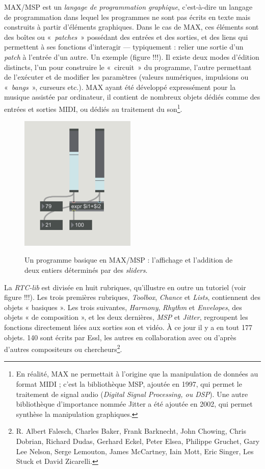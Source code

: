 \documentclass[a4paper,12pt]{article}
\newcommand{\guill}[1]{«~#1~»}
\begin{document}
MAX/MSP est un \emph{langage de programmation graphique}, c'est-à-dire un langage de programmation dans lequel les programmes ne sont pas écrits en texte mais construits à partir d'éléments graphiques. Dans le cas de MAX, ces éléments sont des boîtes ou \guill{\emph{patches}} possédant des entrées et des sorties, et des liens qui permettent à ses fonctions d'interagir --- typiquement : relier une sortie d'un \emph{patch} à l'entrée d'un autre. Un exemple (figure !!!). Il existe deux modes d'édition distincts, l'un pour construire le \guill{circuit} du programme, l'autre permettant de l'exécuter et de modifier les paramètres (valeurs numériques, impulsions ou \guill{\emph{bangs}}, curseurs etc.). MAX ayant été développé expressément pour la musique assistée par ordinateur, il contient de nombreux objets dédiés comme des entrées et sorties MIDI, ou dédiés au traitement du son\footnote{En réalité, MAX ne permettait à l'origine que la manipulation de données au format MIDI ; c'est la bibliothèque MSP, ajoutée en 1997, qui permet le traitement de signal audio (\emph{Digital Signal Processing, ou DSP}). Une autre bibliothèque d'importance nommée Jitter a été ajoutée en 2002, qui permet synthèse la manipulation graphiques.}.

\begin{figure}[h!]
\centering
\includegraphics[width=5.5cm]{images/MAXbase.png}
\label{maxmsp}
\caption{Un programme basique en MAX/MSP : l'affichage et l'addition de deux entiers déterminés par des \emph{sliders}.}
\end{figure}


La \emph{RTC-lib} est divisée en huit rubriques, qu'illustre en outre un tutoriel (voir figure !!!). Les trois premières rubriques, \emph{Toolbox}, \emph{Chance} et \emph{Lists}, contiennent des objets « basiques ». Les trois suivantes, \emph{Harmony}, \emph{Rhythm} et \emph{Envelopes}, des objets « de composition », et les deux dernières, \emph{MSP} et \emph{Jitter}, regroupent les fonctions directement liées aux sorties son et vidéo. À ce jour il y a en tout 177 objets. 140 sont écrits par Essl, les autres en collaboration avec ou d'après d'autres compositeurs ou chercheurs\footnote{R. Albert Falesch, Charles Baker, Frank Barknecht, John Chowing, Chris Dobrian, Richard Dudas, Gerhard Eckel, Peter Elsea, Philippe Gruchet, Gary Lee Nelson, Serge Lemouton, James McCartney, Iain Mott, Eric Singer, Les Stuck et David Zicarelli.}.
\end{document}
